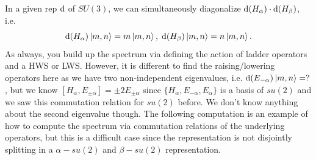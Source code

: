 In a given rep $\mathrm{d}$ of $SU(3)$, we can simultaneously diagonalize $\mathrm{d}(H_\alpha) \cdot \mathrm{d}(H_\beta)$, i.e.
 \begin{equation*}
 	\mathrm{d}(H_\alpha) \ket{m,n} = m \ket{m,n},\; \mathrm{d}(H_\beta) \ket{m,n} = n \ket{m,n}.
 \end{equation*}
As always, you build up the spectrum via defining the action of ladder operators and a HWS or LWS. However, it is different to find the raising/lowering operators here as we have two non-independent eigenvalues, i.e. $\mathrm{d}(E_{-\alpha}) \ket{m,n} = ?$, but we know $[H_\alpha,E_{\pm \alpha}]= \pm 2 E_{\pm \alpha}$ since $\{H_\alpha,E_{-\alpha},E_\alpha\}$ is a basis of $su(2)$ and we saw this commutation relation for $su(2)$ before. We don't know anything about the second eigenvalue though. The following computation is an example of how to compute the spectrum via commutation relations of the underlying operators, but this is a difficult case since the representation is not disjointly splitting in a $\alpha-su(2)$ and $\beta-su(2)$ representation.\\
